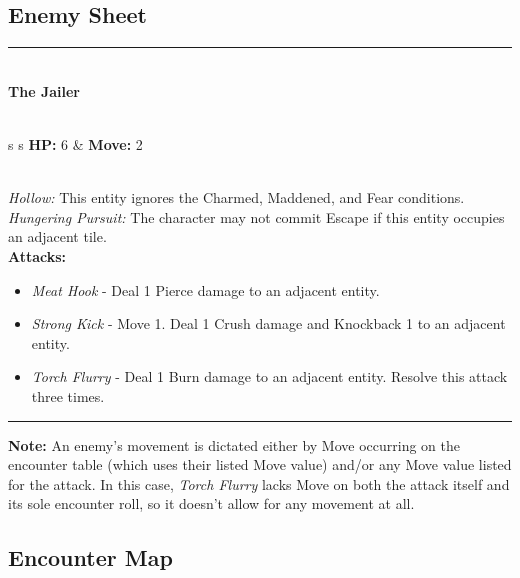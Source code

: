\subsection*{Enemy Sheet}
\hrule
\ \\
{\large \textbf{The Jailer}}\\\\
\begin{tabular}{s s}
\textbf{HP:} 6 & \textbf{Move:} 2\\
\end{tabular}\\

\emph{Hollow:} This entity ignores the Charmed, Maddened, and Fear conditions.\\

\emph{Hungering Pursuit:} The character may not commit Escape if this entity occupies an adjacent tile.\\

\textbf{Attacks:}
\begin{itemize}
\item \emph{Meat Hook} - Deal 1 Pierce damage to an adjacent entity.
\item \emph{Strong Kick} - Move 1. Deal 1 Crush damage and Knockback 1 to an adjacent entity.
\item \emph{Torch Flurry} - Deal 1 Burn damage to an adjacent entity. Resolve this attack three times.
\end{itemize}
\hrule

\pagebreak

\begin{tcolorbox}
\textbf{Note:} An enemy’s movement is dictated either by Move occurring on the encounter table (which uses their listed Move value) and/or any Move value listed for the attack. In this case, \emph{Torch Flurry} lacks Move on both the attack itself and its sole encounter roll, so it doesn’t allow for any movement at all. 
\end{tcolorbox}

\subsection*{Encounter Map}

